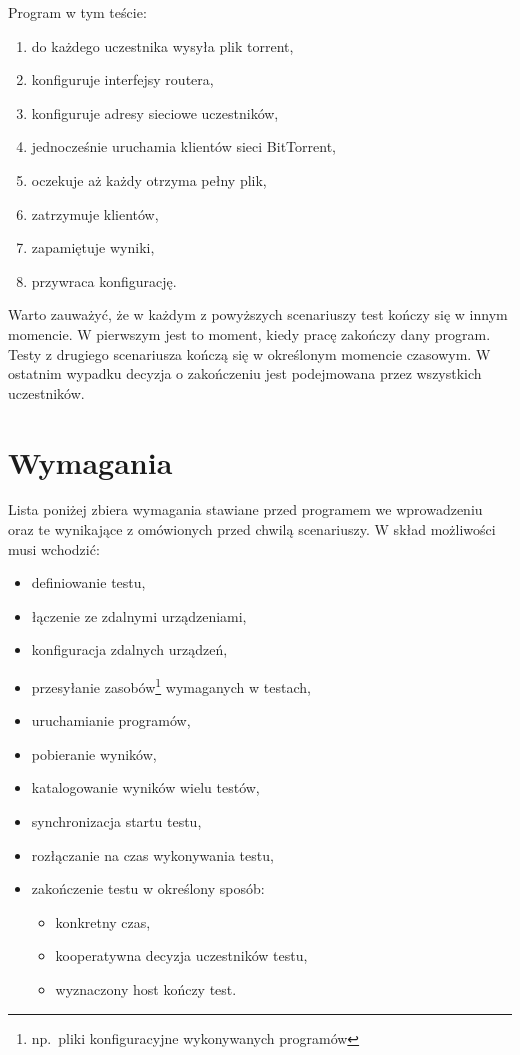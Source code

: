 \documentclass[00-praca-magisterska.tex]{subfiles}
\begin{document}
Program w tym teście:
\begin{enumerate}
\item do każdego uczestnika wysyła plik torrent,
\item konfiguruje interfejsy routera,
\item konfiguruje adresy sieciowe uczestników,
\item jednocześnie uruchamia klientów sieci BitTorrent,
\item oczekuje aż każdy otrzyma pełny plik,
\item zatrzymuje klientów,
\item zapamiętuje wyniki,
\item przywraca konfigurację.
\end{enumerate}

Warto zauważyć, że w każdym z powyższych scenariuszy test kończy się w innym
momencie. W pierwszym jest to moment, kiedy pracę zakończy dany program. Testy
z drugiego scenariusza kończą się w określonym momencie czasowym. W ostatnim
wypadku decyzja o zakończeniu jest podejmowana przez wszystkich uczestników.

\section{Wymagania}

Lista poniżej zbiera wymagania stawiane przed programem we wprowadzeniu oraz te
wynikające z omówionych przed chwilą scenariuszy. W skład możliwości musi wchodzić:
\begin{itemize}
\item definiowanie testu,
\item łączenie ze zdalnymi urządzeniami,
\item konfiguracja zdalnych urządzeń,
\item przesyłanie zasobów\footnote{np.~pliki konfiguracyjne wykonywanych programów}  wymaganych w testach,
\item uruchamianie programów,
\item pobieranie wyników,
\item katalogowanie wyników wielu testów,
\item synchronizacja startu testu,
\item rozłączanie na czas wykonywania testu,
\item zakończenie testu w określony sposób:
  \begin{itemize}
  \item konkretny czas,
  \item kooperatywna decyzja uczestników testu,
  \item wyznaczony host kończy test.
  \end{itemize}
\end{itemize}
\end{document}
